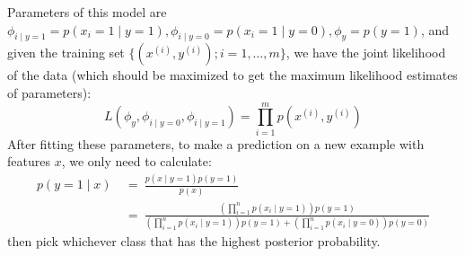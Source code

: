 \documentclass{article}
\begin{document}
Parameters of this model are $\phi_{i\mid y=1}=p(x_i=1\mid y=1), \phi_{i\mid y=0}=p(x_i=1\mid y=0), \phi_y=p(y=1)$, and given the training set $\{(x^{(i)},y^{(i)});i=1,\ldots,m\}$, we have the joint likelihood of the data (which should be maximized to get the maximum likelihood estimates of parameters):
\begin{equation*}
L(\phi_{y},\phi_{i\mid y=0},\phi_{i\mid y=1})=\prod_{i=1}^mp(x^{(i)},y^{(i)})
\end{equation*}
After fitting these parameters, to make a prediction on a new example with features $x$, we only need to calculate:
\begin{align*}
p(y=1\mid x)\ &=\ \frac{p(x\mid y=1)p(y=1)}{p(x)} \\
              &=\ \frac{\left(\prod\limits_{i=1}^np(x_i\mid y=1)\right)p(y=1)}{\left(\prod\limits_{i=1}^np(x_i\mid y=1)\right)p(y=1)+\left(\prod\limits_{i=1}^np(x_i\mid y=0)\right)p(y=0)}
\end{align*}
then pick whichever class that has the highest posterior probability.
\end{document}

